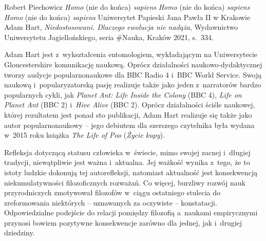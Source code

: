 \begin{newrevplenv}{Robert Piechowicz}
	{\textit{Homo} (nie do końca) \textit{sapiens}}
	{\textit{Homo} (nie do końca) \textit{sapiens}}
	{\textit{Homo} (nie do końca) \textit{sapiens}}
	{Uniwersytet Papieski Jana Pawła II w Krakowie}
	{Adam Hart, \textit{Niedostosowani. Dlaczego ewolucja nie nadąża}, Wydawnictwo Uniwersytetu Jagiellońskiego, seria \#Nauka, Kraków 2021, s.~334.}



\lettrine[loversize=0.13,lines=2,lraise=-0.03,nindent=0em,findent=0.2pt]%
{A}{}dam Hart jest z~wykształcenia entomologiem, wykładającym na Uniwersytecie Gloucestershire komunikację naukową. Oprócz działalności naukowo-dydaktycznej tworzy audycje popularnonaukowe dla BBC Radio 4 i~BBC World Service. Swoją naukową i~popularyzatorską pasję realizuje także jako jeden z~narratorów bardzo popularnych cykli, jak \textit{Planet Ant: Life Inside the Colony} (BBC 4), \textit{Life on Planet Ant} (BBC 2) i~\textit{Hive Alive} (BBC 2). Oprócz działalności ściśle naukowej, której rezultatem jest ponad sto publikacji, Adam Hart realizuje się także jako autor popularnonaukowy -- jego debiutem dla szerszego czytelnika była wydana w~2015 roku książka \textit{The Life of Poo} (\textit{Życie kupy}).

Refleksja dotyczącą statusu człowieka w~świecie, mimo swojej zacnej i~długiej tradycji, niewątpliwie jest ważna i~aktualna. Jej ważkość wynika z~tego, że to istoty ludzkie dokonują tej autorefleksji, natomiast aktualność jest konsekwencją niekumulatywności filozoficznych rozważań. Co więcej, burzliwy rozwój nauk przyrodniczych zmotywował filozofów w~ciągu ostatniego stulecia do zreformowania niektórych -- uznawanych za oczywiste -- konstatacji. Odpowiedzialne podejście do relacji pomiędzy filozofią a~naukami empirycznymi przynosi bowiem pozytywne konsekwencje zarówno dla jednej, jak i~drugiej dziedziny.


\end{newrevplenv}
